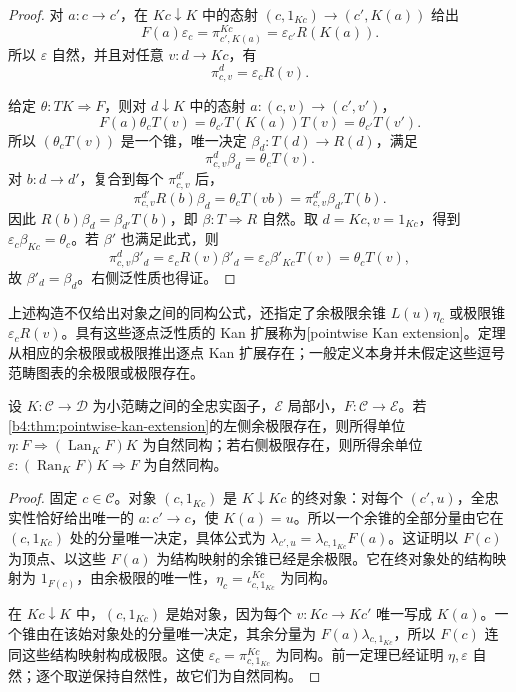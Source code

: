\begin{proof}
	对 \(a:c\rightarrow c'\)，在 \(Kc\downarrow K\) 中的态射
	\((c,1_{Kc})\rightarrow(c',K(a))\) 给出
	\[
		F(a)\varepsilon_c
		=\pi^{Kc}_{c',K(a)}
		=\varepsilon_{c'}R(K(a)).
	\]
	所以 \(\varepsilon\) 自然，并且对任意 \(v:d\rightarrow Kc\)，有
	\begin{equation}\label{b4:eq:right-kan-structural-cone}
		\pi^d_{c,v}=\varepsilon_cR(v).
	\end{equation}

	给定 \(\theta:TK\Rightarrow F\)，则对 \(d\downarrow K\) 中的态射 \(a:(c,v)\rightarrow(c',v')\)，
	\[
		F(a)\theta_cT(v)
		=\theta_{c'}T(K(a))T(v)
		=\theta_{c'}T(v').
	\]
	所以 \((\theta_cT(v))\) 是一个锥，唯一决定 \(\beta_d:T(d)\rightarrow R(d)\)，满足
	\begin{equation}\label{b4:eq:right-kan-factorization}
		\pi^d_{c,v}\beta_d=\theta_cT(v).
	\end{equation}
	对 \(b:d\rightarrow d'\)，复合到每个 \(\pi^{d'}_{c,v}\) 后，
	\[
		\pi^{d'}_{c,v}R(b)\beta_d
		=\theta_cT(vb)
		=\pi^{d'}_{c,v}\beta_{d'}T(b).
	\]
	因此 \(R(b)\beta_d=\beta_{d'}T(b)\)，即 \(\beta:T\Rightarrow R\) 自然。取 \(d=Kc,v=1_{Kc}\)，得到 \(\varepsilon_c\beta_{Kc}=\theta_c\)。若 \(\beta'\) 也满足此式，则
	\[
		\pi^d_{c,v}\beta'_d
		=\varepsilon_cR(v)\beta'_d
		=\varepsilon_c\beta'_{Kc}T(v)
		=\theta_cT(v),
	\]
	故 \(\beta'_d=\beta_d\)。右侧泛性质也得证。
\end{proof}

上述构造不仅给出对象之间的同构公式，还指定了余极限余锥 \(L(u)\eta_c\) 或极限锥 \(\varepsilon_cR(v)\)。具有这些逐点泛性质的 Kan 扩展称为[pointwise Kan extension]。定理从相应的余极限或极限推出逐点 Kan 扩展存在；一般定义本身并未假定这些逗号范畴图表的余极限或极限存在。

\begin{corollary}[全忠实函子上的恢复]\label{b4:cor:fully-faithful-pointwise-kan}
	设 \(K:\mathcal C\rightarrow\mathcal D\) 为小范畴之间的全忠实函子，\(\mathcal E\) 局部小，\(F:\mathcal C\rightarrow\mathcal E\)。若\cref{b4:thm:pointwise-kan-extension}的左侧余极限存在，则所得单位 \(\eta:F\Rightarrow(\operatorname{Lan}_K F)K\) 为自然同构；若右侧极限存在，则所得余单位 \(\varepsilon:(\operatorname{Ran}_K F)K\Rightarrow F\) 为自然同构。
\end{corollary}
\begin{proof}
	固定 \(c\in\mathcal C\)。对象 \((c,1_{Kc})\) 是 \(K\downarrow Kc\) 的终对象：对每个 \((c',u)\)，全忠实性恰好给出唯一的 \(a:c'\rightarrow c\)，使 \(K(a)=u\)。所以一个余锥的全部分量由它在 \((c,1_{Kc})\) 处的分量唯一决定，具体公式为 \(\lambda_{c',u}=\lambda_{c,1_{Kc}}F(a)\)。这证明以 \(F(c)\) 为顶点、以这些 \(F(a)\) 为结构映射的余锥已经是余极限。它在终对象处的结构映射为 \(1_{F(c)}\)，由余极限的唯一性，\(\eta_c=\iota^{Kc}_{c,1_{Kc}}\) 为同构。

	在 \(Kc\downarrow K\) 中，\((c,1_{Kc})\) 是始对象，因为每个 \(v:Kc\rightarrow Kc'\) 唯一写成 \(K(a)\)。一个锥由在该始对象处的分量唯一决定，其余分量为 \(F(a)\lambda_{c,1_{Kc}}\)，所以 \(F(c)\) 连同这些结构映射构成极限。这使 \(\varepsilon_c=\pi^{Kc}_{c,1_{Kc}}\) 为同构。前一定理已经证明 \(\eta,\varepsilon\) 自然；逐个取逆保持自然性，故它们为自然同构。
\end{proof}

